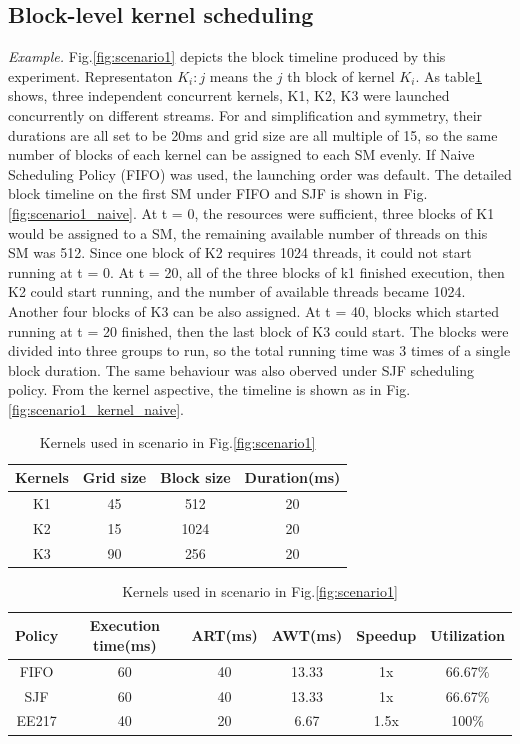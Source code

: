 \documentclass[conference]{IEEEtran}
\begin{document}
\subsection{Block-level kernel scheduling}
\textit{Example.}
Fig.\ref{fig:scenario1} depicts the block timeline produced by this experiment. Representaton $K_i:j$ means the $j$ th block of kernel $K_i$. As table\ref{table:scenario1_kernel} shows, three independent concurrent kernels, K1, K2, K3 were launched concurrently on different streams. For and simplification and symmetry, their durations are all set to be 20ms and grid size are all multiple of 15, so the same number of blocks of each kernel can be assigned to each SM evenly. If Naive Scheduling Policy (FIFO) was used, the launching order was default. The detailed block timeline on the first SM under FIFO and SJF is shown in Fig.\ref{fig:scenario1_naive}. At t = 0, the resources were sufficient, three blocks of K1 would be assigned to a SM, the remaining available number of threads on this SM was 512. Since one block of K2 requires 1024 threads, it could not start running at t = 0. At t = 20, all of the three blocks of k1 finished execution, then K2 could start running, and the number of available threads became 1024. Another four blocks of K3 can be also assigned. At t = 40, blocks which started running at t = 20 finished, then the last block of K3 could start. The blocks were divided into three groups to run, so the total running time was 3 times of a single block duration. The same behaviour was also oberved under SJF scheduling policy. From the kernel aspective, the timeline is shown as in Fig.\ref{fig:scenario1_kernel_naive}.\par

\begin{table}[h]
   \caption{Kernels used in scenario in Fig.\ref{fig:scenario1}}
   \centering
   \begin{tabular}{|c|c|c|c|}
   \hline
   \bf Kernels & \bf Grid size & \bf Block size & \bf Duration(ms)\\
   \hline
   K1 & 45 & 512 & 20 \\
   K2 & 15 & 1024 & 20\\ 
   K3 & 90 & 256 & 20 \\
   \hline
   \end{tabular}
   \label{table:scenario1_kernel}
\end{table}

\begin{table}[h]
   \caption{Kernels used in scenario in Fig.\ref{fig:scenario1}}
   \centering
   \begin{tabular}{|c|c|c|c|c|c|}
   \hline
   \bf Policy & \bf Execution time(ms)& \bf ART(ms) & \bf AWT(ms) & \bf Speedup & \bf Utilization \\
   \hline
   FIFO & 60 & 40 & 13.33 & 1x & 66.67$\%$ \\
   SJF & 60 & 40 & 13.33 & 1x & 66.67$\%$\\ 
   EE217 & 40 & 20 & 6.67 & 1.5x & 100$\%$\\
   \hline
   \end{tabular}
   \label{table:scenario1_result}
\end{table}
\end{document}
